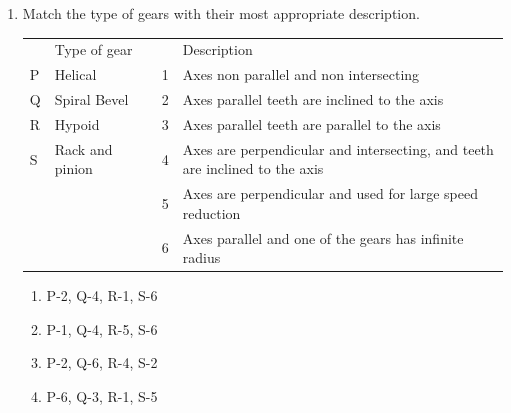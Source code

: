 \documentclass[journal,12pt,onecolumn]{IEEEtran}
\begin{document}
\begin{enumerate}[resume]
    \item Match the type of gears with their most appropriate description.
          \begin{table}[H]
              \centering\large
              \begin{tabular}{|p{0.2in}|p{1in}|p{0.2in}|p{0.2in}|p{3in}|}
                  \hline
                    & Type of gear    &  &   & Description                                                                 \\
                  \cline{1-2}\cline{4-5}
                  P & Helical         &  & 1 & Axes non parallel and non intersecting                                      \\
                  \cline{1-2}\cline{4-5}
                  Q & Spiral Bevel    &  & 2 & Axes parallel teeth are inclined to the axis                                \\
                  \cline{1-2}\cline{4-5}
                  R & Hypoid          &  & 3 & Axes parallel teeth are parallel to the axis                                \\
                  \cline{1-2}\cline{4-5}
                  S & Rack and pinion &  & 4 & Axes are perpendicular and intersecting, and teeth are inclined to the axis \\
                  \cline{1-2}\cline{4-5}
                    &                 &  & 5 & Axes are perpendicular and used for large speed reduction                   \\
                  \cline{1-2}\cline{4-5}
                    &                 &  & 6 & Axes parallel and one of the gears has infinite radius                      \\
                  \cline{1-2}\cline{4-5}
              \end{tabular}
              \label{q43}
          \end{table}

          \begin{enumerate}
              \item P-2, Q-4, R-1, S-6
              \item P-1, Q-4, R-5, S-6
              \item P-2, Q-6, R-4, S-2
              \item P-6, Q-3, R-1, S-5
          \end{enumerate}


\end{enumerate}
\end{document}
